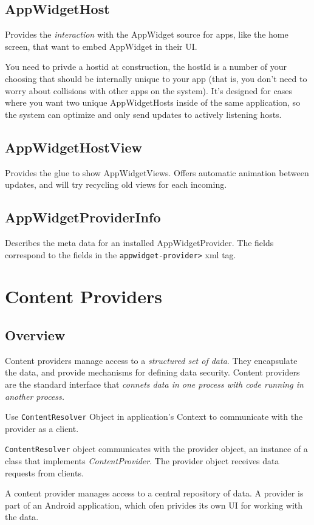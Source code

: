 \documentclass[11pt, a4paper]{book}
\begin{document}
\subsection{AppWidgetHost}
Provides the \emph{interaction} with the AppWidget source for apps, like the
home screen, that want to embed AppWidget in their UI.

You need to privde a hostid at construction, the hostId is a number of your 
choosing that should be internally unique to your app (that is, you don't 
need to worry about collisions with other apps on the system).  It's designed 
for cases where you want two unique AppWidgetHosts inside of the same 
application, so the system can optimize and only send updates to actively 
listening hosts. 

\subsection{AppWidgetHostView}
Provides the glue to show AppWidgetViews. Offers automatic animation between
updates, and will try recycling old views for each incoming.
\subsection{AppWidgetProviderInfo}
Describes the meta data for an installed AppWidgetProvider. The fields
correspond to the fields in the \verb|appwidget-provider>| xml tag.


\section{Content Providers}
\subsection{Overview}
Content providers manage access to a \emph{structured set of data}. They
encapsulate the data, and provide mechanisms for defining data security. Content
providers are the standard interface that \emph{connets data in one process with
code running in another process.}

Use \verb|ContentResolver| Object in application's Context to communicate with
the provider as a client. 

\verb|ContentResolver| object communicates with the provider object, an instance
of a class that implements \emph{ContentProvider}. The provider object receives
data requests from clients. 

A content provider manages access to a central repository of data. A provider is
part of an Android application, which ofen privides its own UI for working with
the data. 
\end{document}
